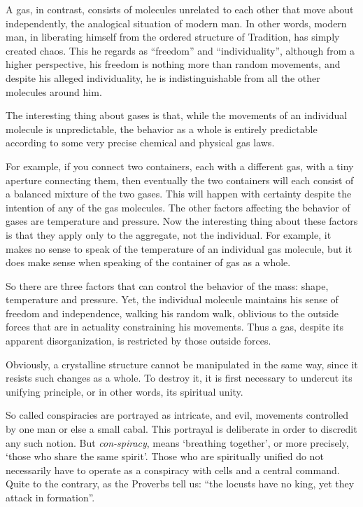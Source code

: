 A gas, in contrast, consists of molecules unrelated to each other that move about independently, the analogical situation of modern man. In other words, modern man, in liberating himself from the ordered structure of Tradition, has simply created chaos. This he regards as ``freedom'' and ``individuality'', although from a higher perspective, his freedom is nothing more than random movements, and despite his alleged individuality, he is indistinguishable from all the other molecules around him.

The interesting thing about gases is that, while the movements of an individual molecule is unpredictable, the behavior as a whole is entirely predictable according to some very precise chemical and physical gas laws.

For example, if you connect two containers, each with a different gas, with a tiny aperture connecting them, then eventually the two containers will each consist of a balanced mixture of the two gases. This will happen with certainty despite the intention of any of the gas molecules. The other factors affecting the behavior of gases are temperature and pressure. Now the interesting thing about these factors is that they apply only to the aggregate, not the individual. For example, it makes no sense to speak of the temperature of an individual gas molecule, but it does make sense when speaking of the container of gas as a whole.

So there are three factors that can control the behavior of the mass: shape, temperature and pressure. Yet, the individual molecule maintains his sense of freedom and independence, walking his random walk, oblivious to the outside forces that are in actuality constraining his movements. Thus a gas, despite its apparent disorganization, is restricted by those outside forces.

Obviously, a crystalline structure cannot be manipulated in the same way, since it resists such changes as a whole. To destroy it, it is first necessary to undercut its unifying principle, or in other words, its spiritual unity.

So called conspiracies are portrayed as intricate, and evil, movements controlled by one man or else a small cabal. This portrayal is deliberate in order to discredit any such notion. But \emph{con-spiracy}, means `breathing together', or more precisely, `those who share the same spirit'. Those who are spiritually unified do not necessarily have to operate as a conspiracy with cells and a central command. Quite to the contrary, as the Proverbs tell us: ``the locusts have no king, yet they attack in formation''.

